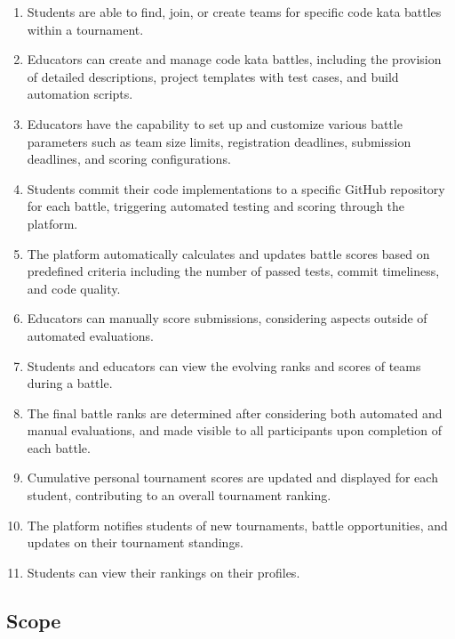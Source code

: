 \begin{enumerate}

\item Students are able to find, join, or create teams for specific code kata battles within a tournament.

\item  Educators can create and manage code kata battles, including the provision of detailed descriptions, project templates with test cases, and build automation scripts.

\item  Educators have the capability to set up and customize various battle parameters such as team size limits, registration deadlines, submission deadlines, and scoring configurations.

\item  Students commit their code implementations to a specific GitHub repository for each battle, triggering automated testing and scoring through the platform.

\item  The platform automatically calculates and updates battle scores based on predefined criteria including the number of passed tests, commit timeliness, and code quality.

\item  Educators can manually score submissions, considering aspects outside of automated evaluations.

\item  Students and educators can view the evolving ranks and scores of teams during a battle.

\item  The final battle ranks are determined after considering both automated and manual evaluations, and made visible to all participants upon completion of each battle.

\item  Cumulative personal tournament scores are updated and displayed for each student, contributing to an overall tournament ranking.

\item  The platform notifies students of new tournaments, battle opportunities, and updates on their tournament standings.

\item  Students can view their rankings on their profiles.
\end{enumerate}

\subsection{Scope}

